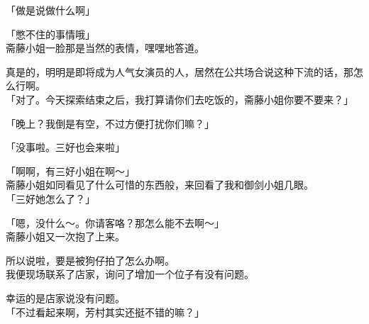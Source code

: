 「做是说做什么啊」

「憋不住的事情哦」\\

斋藤小姐一脸那是当然的表情，嘿嘿地答道。

真是的，明明是即将成为人气女演员的人，居然在公共场合说这种下流的话，那怎么行啊。\\

「对了。今天探索结束之后，我打算请你们去吃饭的，斋藤小姐你要不要来？」

「晚上？我倒是有空，不过方便打扰你们嘛？」

「没事啦。三好也会来啦」

「啊啊，有三好小姐在啊～」\\

斋藤小姐如同看见了什么可惜的东西般，来回看了我和御剑小姐几眼。\\

「三好她怎么了？」

「嗯，没什么～。你请客咯？那怎么能不去啊～」\\

斋藤小姐又一次抱了上来。

所以说啦，要是被狗仔拍了怎么办啊。\\

我便现场联系了店家，询问了增加一个位子有没有问题。

幸运的是店家说没有问题。\\

「不过看起来啊，芳村其实还挺不错的嘛？」

